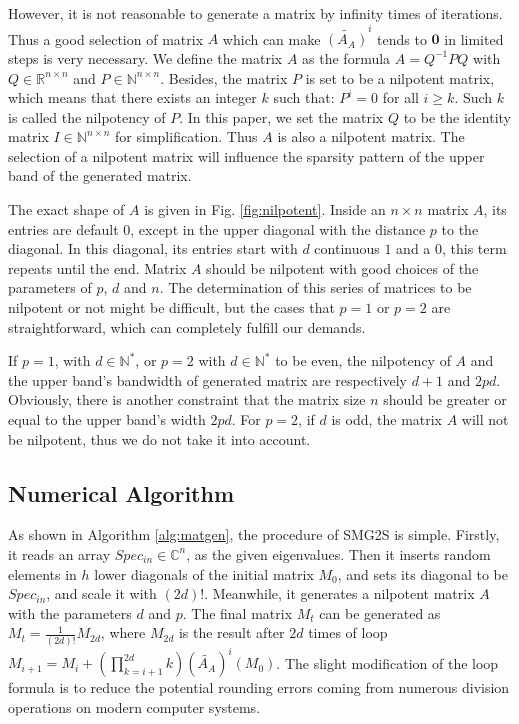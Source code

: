 However, it is not reasonable to generate a matrix by infinity times of iterations. Thus a good selection of matrix $A$ which can make $\widetilde{(A_A)}^i$ tends to $\textbf{0}$ in limited steps is very necessary. We define the matrix $A$  as the formula $A=Q^{-1}PQ$ with $Q \in \mathbb{R}^{n \times n}$ and $P \in \mathbb{N}^{n \times n}$. Besides, the matrix $P$ is set to be a nilpotent matrix, which means that there exists an integer $k$ such that: $P^i=0$ for all $i \ge k$. Such $k$ is called the nilpotency of $P$.  In this paper, we set the matrix $Q$ to be the identity matrix $I \in \mathbb{N}^{n \times n}$ for simplification. Thus $A$ is also a nilpotent matrix.  The selection of a nilpotent matrix will influence the sparsity pattern of the upper band of the generated matrix. 

The exact shape of $A$ is given in Fig. \ref{fig:nilpotent}. Inside an $n \times n$ matrix $A$, its entries are default $0$, except in the upper diagonal with the distance $p$ to the diagonal. In this diagonal, its entries start with $d$ continuous $1$ and a $0$, this term repeats until the end. Matrix $A$ should be nilpotent with good choices of the parameters of $p$, $d$ and $n$. The determination of this series of matrices to be nilpotent or not might be difficult, but the cases that $p=1$ or $p=2$ are straightforward, which can completely fulfill our demands.

If $p=1$, with $d \in \mathbb{N^*}$, or $p=2$ with $d \in \mathbb{N^*}$ to be even, the nilpotency of $A$ and the upper band's bandwidth of generated matrix are respectively $d+1$  and $2pd$. Obviously, there is another constraint that the matrix size $n$ should be greater or equal to the upper band's width $2pd$. For $p=2$, if $d$ is odd, the matrix $A$ will not be nilpotent, thus we do not take it into account.

\subsection{Numerical Algorithm}

As shown in Algorithm \ref{alg:matgen}, the procedure of SMG2S is simple. Firstly, it reads an array $Spec_{in} \in \mathbb{C}^{n}$, as the given eigenvalues. Then it inserts random elements in $h$ lower diagonals of the initial matrix $M_0$, and sets its diagonal to be $Spec_{in}$, and scale it with $(2d)!$. Meanwhile, it generates a nilpotent matrix $A$ with the parameters $d$ and $p$. The final matrix $M_t$ can be generated as $M_t=\frac{1}{(2d)!}M_{2d}$, where $M_{2d}$ is the result after $2d$ times of loop $M_{i+1}=M_i+(\prod_{k=i+1}^{2d}k)(\widetilde{A_A})^i(M_0)$. The slight modification of the loop formula is to reduce the potential rounding errors coming from numerous division operations on modern computer systems.

